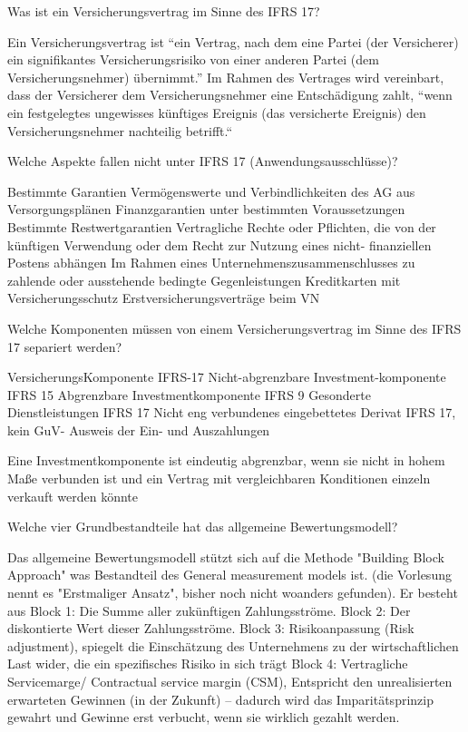 Was ist ein Versicherungsvertrag im Sinne des IFRS 17?

Ein Versicherungsvertrag ist “ein Vertrag, nach dem eine Partei (der Versicherer) ein signifikantes Versicherungsrisiko
von einer anderen Partei (dem Versicherungsnehmer) übernimmt.”
Im Rahmen des Vertrages wird vereinbart, dass der Versicherer dem Versicherungsnehmer eine Entschädigung
zahlt, “wenn ein festgelegtes ungewisses künftiges Ereignis (das versicherte Ereignis) den Versicherungsnehmer
nachteilig betrifft.“


Welche Aspekte fallen nicht unter IFRS 17 (Anwendungsausschlüsse)?

Bestimmte Garantien
Vermögenswerte und Verbindlichkeiten des AG aus Versorgungsplänen
Finanzgarantien unter bestimmten Voraussetzungen
Bestimmte Restwertgarantien
Vertragliche Rechte oder Pflichten, die von der künftigen Verwendung oder dem Recht zur Nutzung eines nicht-
finanziellen Postens abhängen
Im Rahmen eines Unternehmenszusammenschlusses zu zahlende oder ausstehende bedingte Gegenleistungen
Kreditkarten mit Versicherungsschutz
Erstversicherungsverträge beim VN

Welche Komponenten müssen von einem Versicherungsvertrag im Sinne des IFRS 17 separiert werden?

VersicherungsKomponente IFRS-17
Nicht-abgrenzbare Investment-komponente IFRS 15
Abgrenzbare Investmentkomponente IFRS 9
Gesonderte Dienstleistungen IFRS 17
Nicht eng verbundenes eingebettetes Derivat IFRS 17, kein GuV- Ausweis der Ein- und Auszahlungen

Eine Investmentkomponente ist eindeutig abgrenzbar, wenn sie nicht in hohem Maße verbunden ist und ein Vertrag
mit vergleichbaren Konditionen einzeln verkauft werden könnte


Welche vier Grundbestandteile hat das allgemeine Bewertungsmodell?

Das allgemeine Bewertungsmodell stützt sich auf die Methode "Building Block Approach"
was Bestandteil des General measurement models ist.
(die Vorlesung nennt es "Erstmaliger Ansatz", bisher noch nicht woanders gefunden).
Er besteht aus
Block 1: Die Summe aller zukünftigen Zahlungsströme.
Block 2: Der diskontierte Wert dieser Zahlungsströme.
Block 3: Risikoanpassung (Risk adjustment), spiegelt die Einschätzung des Unternehmens zu der wirtschaftlichen Last wider, 
         die ein spezifisches Risiko in sich trägt
Block 4: Vertragliche Servicemarge/ Contractual service margin (CSM), Entspricht den unrealisierten erwarteten Gewinnen (in der Zukunft) – 
         dadurch wird das Imparitätsprinzip gewahrt und Gewinne erst verbucht, wenn sie wirklich gezahlt werden. 

